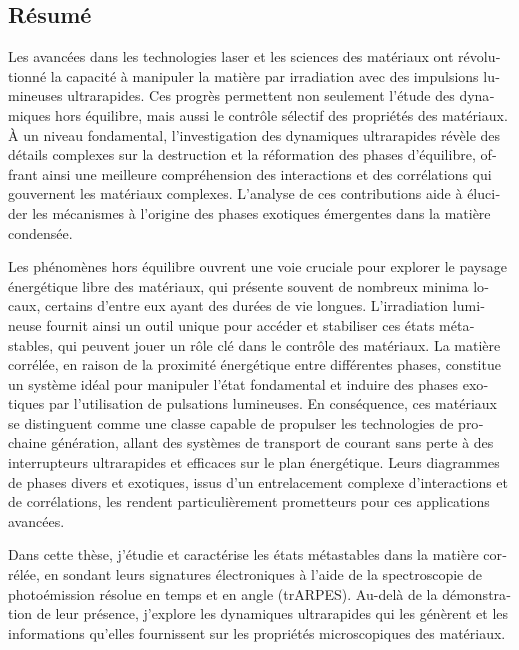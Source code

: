 \begin{otherlanguage}{french}
\cleardoublepage
\chapter*{Résumé}
Les avancées dans les technologies laser et les sciences des matériaux ont révolutionné la capacité à manipuler la matière par irradiation avec des impulsions lumineuses ultrarapides. Ces progrès permettent non seulement l’étude des dynamiques hors équilibre, mais aussi le contrôle sélectif des propriétés des matériaux. À un niveau fondamental, l’investigation des dynamiques ultrarapides révèle des détails complexes sur la destruction et la réformation des phases d’équilibre, offrant ainsi une meilleure compréhension des interactions et des corrélations qui gouvernent les matériaux complexes. L’analyse de ces contributions aide à élucider les mécanismes à l'origine des phases exotiques émergentes dans la matière condensée.

Les phénomènes hors équilibre ouvrent une voie cruciale pour explorer le paysage énergétique libre des matériaux, qui présente souvent de nombreux minima locaux, certains d’entre eux ayant des durées de vie longues. L'irradiation lumineuse fournit ainsi un outil unique pour accéder et stabiliser ces états métastables, qui peuvent jouer un rôle clé dans le contrôle des matériaux. La matière corrélée, en raison de la proximité énergétique entre différentes phases, constitue un système idéal pour manipuler l'état fondamental et induire des phases exotiques par l’utilisation de pulsations lumineuses. En conséquence, ces matériaux se distinguent comme une classe capable de propulser les technologies de prochaine génération, allant des systèmes de transport de courant sans perte à des interrupteurs ultrarapides et efficaces sur le plan énergétique. Leurs diagrammes de phases divers et exotiques, issus d’un entrelacement complexe d’interactions et de corrélations, les rendent particulièrement prometteurs pour ces applications avancées.\hfill\break

Dans cette thèse, j’étudie et caractérise les états métastables dans la matière corrélée, en sondant leurs signatures électroniques à l'aide de la spectroscopie de photoémission résolue en temps et en angle (trARPES). Au-delà de la démonstration de leur présence, j'explore les dynamiques ultrarapides qui les génèrent et les informations qu’elles fournissent sur les propriétés microscopiques des matériaux. \hfill\break


\end{otherlanguage}
